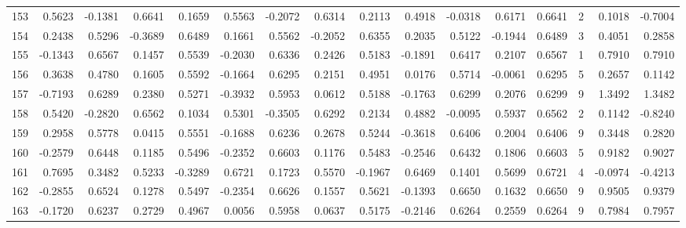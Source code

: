\begin{tabular}{lrrrrrrrrrrrrrrr}
153 &      0.5623 & -0.1381 &  0.6641 &  0.1659 &  0.5563 & -0.2072 &  0.6314 &  0.2113 &  0.4918 & -0.0318 &   0.6171 &     0.6641 &      2 &                    0.1018 &                    -0.7004 \\
154 &      0.2438 &  0.5296 & -0.3689 &  0.6489 &  0.1661 &  0.5562 & -0.2052 &  0.6355 &  0.2035 &  0.5122 &  -0.1944 &     0.6489 &      3 &                    0.4051 &                     0.2858 \\
155 &     -0.1343 &  0.6567 &  0.1457 &  0.5539 & -0.2030 &  0.6336 &  0.2426 &  0.5183 & -0.1891 &  0.6417 &   0.2107 &     0.6567 &      1 &                    0.7910 &                     0.7910 \\
156 &      0.3638 &  0.4780 &  0.1605 &  0.5592 & -0.1664 &  0.6295 &  0.2151 &  0.4951 &  0.0176 &  0.5714 &  -0.0061 &     0.6295 &      5 &                    0.2657 &                     0.1142 \\
157 &     -0.7193 &  0.6289 &  0.2380 &  0.5271 & -0.3932 &  0.5953 &  0.0612 &  0.5188 & -0.1763 &  0.6299 &   0.2076 &     0.6299 &      9 &                    1.3492 &                     1.3482 \\
158 &      0.5420 & -0.2820 &  0.6562 &  0.1034 &  0.5301 & -0.3505 &  0.6292 &  0.2134 &  0.4882 & -0.0095 &   0.5937 &     0.6562 &      2 &                    0.1142 &                    -0.8240 \\
159 &      0.2958 &  0.5778 &  0.0415 &  0.5551 & -0.1688 &  0.6236 &  0.2678 &  0.5244 & -0.3618 &  0.6406 &   0.2004 &     0.6406 &      9 &                    0.3448 &                     0.2820 \\
160 &     -0.2579 &  0.6448 &  0.1185 &  0.5496 & -0.2352 &  0.6603 &  0.1176 &  0.5483 & -0.2546 &  0.6432 &   0.1806 &     0.6603 &      5 &                    0.9182 &                     0.9027 \\
161 &      0.7695 &  0.3482 &  0.5233 & -0.3289 &  0.6721 &  0.1723 &  0.5570 & -0.1967 &  0.6469 &  0.1401 &   0.5699 &     0.6721 &      4 &                   -0.0974 &                    -0.4213 \\
162 &     -0.2855 &  0.6524 &  0.1278 &  0.5497 & -0.2354 &  0.6626 &  0.1557 &  0.5621 & -0.1393 &  0.6650 &   0.1632 &     0.6650 &      9 &                    0.9505 &                     0.9379 \\
163 &     -0.1720 &  0.6237 &  0.2729 &  0.4967 &  0.0056 &  0.5958 &  0.0637 &  0.5175 & -0.2146 &  0.6264 &   0.2559 &     0.6264 &      9 &                    0.7984 &                     0.7957 \\

\end{tabular}
